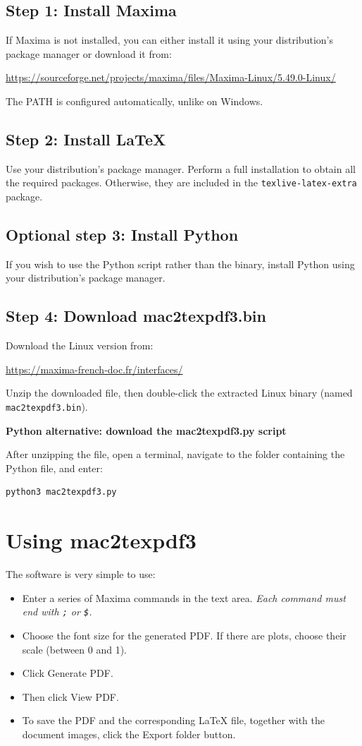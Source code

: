 \documentclass[a4paper,11pt]{article}
\begin{document}
\subsection*{Step 1: Install Maxima}
If Maxima is not installed, you can either install it using your distribution's package manager or download it from:
\begin{center}
\url{https://sourceforge.net/projects/maxima/files/Maxima-Linux/5.49.0-Linux/}
\end{center}
The PATH is configured automatically, unlike on Windows.

\subsection*{Step 2: Install \LaTeX{}}
Use your distribution's package manager. Perform a full installation to obtain all the required packages. Otherwise, they are included in the \texttt{texlive-latex-extra} package.

\subsection*{Optional step 3: Install Python}
If you wish to use the Python script rather than the binary, install Python using your distribution's package manager.

\subsection*{Step 4: Download mac2texpdf3.bin}
Download the Linux version from:
\begin{center}
\url{https://maxima-french-doc.fr/interfaces/}
\end{center}
Unzip the downloaded file, then double-click the extracted Linux binary (named \texttt{mac2texpdf3.bin}).

\textbf{Python alternative: download the mac2texpdf3.py script}

After unzipping the file, open a terminal, navigate to the folder containing the Python file, and enter:
\begin{verbatim}
python3 mac2texpdf3.py
\end{verbatim}

\section*{Using mac2texpdf3}
The software is very simple to use:
\begin{itemize}
\item Enter a series of Maxima commands in the text area. \emph{Each command must end with \texttt{;} or \texttt{\$}.}
\item Choose the font size for the generated PDF. If there are plots, choose their scale (between 0 and 1).
\item Click Generate PDF.
\item Then click View PDF.
\item To save the PDF and the corresponding \LaTeX{} file, together with the document images, click the Export folder button.
\end{itemize}
\end{document}
